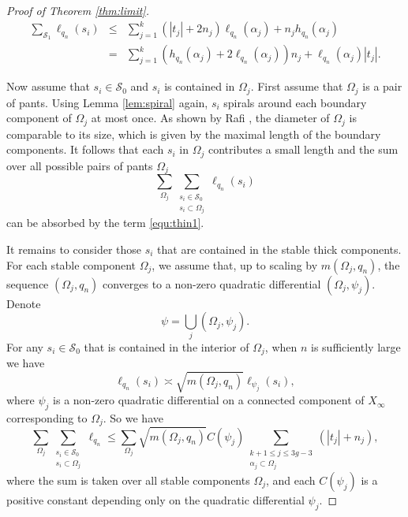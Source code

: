 \documentclass{amsart}
\theoremstyle{plain}
\theoremstyle{definition}
\numberwithin{equation}{section}
\begin{document}
\begin{proof}[Proof of Theorem \ref{thm:limit}]
\begin{eqnarray}\label{equ:thin1}
 \sum_{\mathcal{S}_1} \ell_{q_n}(s_i) & \leq &  \sum_{j=1}^k  \left(|t_j|+2n_j \right) \ell_{q_n}(\alpha_j)
  + n_j h_{q_n}(\alpha_j) \nonumber \\
  &=&  \sum_{j=1}^k  \left(h_{q_n}(\alpha_j) +2 \ell_{q_n}(\alpha_j) \right) n_j + \ell_{q_n}(\alpha_j) |t_j|.
\end{eqnarray} 



Now assume that $s_i\in \mathcal{S}_0$ and $s_i$ is contained in $\Omega_j$. 
First assume that $\Omega_j$ is a pair of pants.
Using Lemma \ref{lem:spiral} again,  $s_i$ spirals around each boundary component of
$\Omega_j$ at most once. As shown by Rafi \cite[Theorem 4]{Rafi07}, the diameter of  $\Omega_j$
is comparable to its size, which is given by the maximal length of the boundary components. It follows that each $s_i$ in $\Omega_j$ contributes a small length and the sum over all possible pairs of pants $\Omega_j$ 
$$\sum_{\Omega_j }\sum_{\substack{s_i\in \mathcal{S}_0 \\
s_i\subset \Omega_j}} \ell_{q_n}(s_i)$$
can be absorbed by the term \eqref{equ:thin1}.


It remains to consider those $s_i$ that are contained in the stable thick components. For each stable component $\Omega_j$, we assume that,  up to scaling by
$m(\Omega_j,q_n)$, the sequence $(\Omega_j, q_n)$ converges to a non-zero quadratic differential $(\Omega_j,\psi_j)$. Denote 
$$\psi=\bigcup_j (\Omega_j,\psi_j). $$
For any $s_i \in \mathcal{S}_0$ that is contained in the interior of  $\Omega_j$, 
when $n$ is sufficiently large we have 
$$\ell_{q_n}(s_i) \asymp \sqrt{m(\Omega_j,q_n)} \ell_{\psi_j}(s_i),$$
where $\psi_j$ is a non-zero quadratic differential on a connected component of $X_\infty$ corresponding to $\Omega_j$. 
So we have
\begin{equation}\label{equ:thick}
 \sum_{\Omega_j} \sum_{\substack{s_i\in \mathcal{S}_0 \\
s_i\subset \Omega_j}}  \ell_{q_n}\leq  \sum_{\Omega_j} \sqrt{m(\Omega_j,q_n)} C(\psi_j)   \sum_{\substack{k+1\leq j \leq 3g-3 \\ \alpha_j \subset \Omega_j}}   (|t_j| + n_j),
\end{equation}
where the sum is taken over all stable components $\Omega_j$,
and each $C(\psi_j)$ is a positive constant depending only on the quadratic differential $\psi_j$.





\end{proof}
\end{document}
